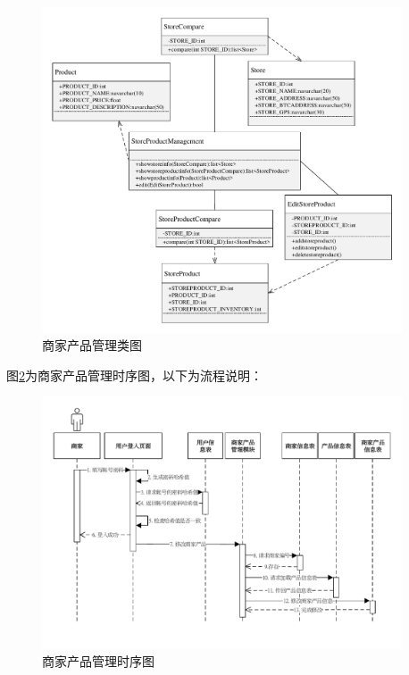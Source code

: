 	\begin{figure}[!htbp]
		\centering
		\includegraphics[width = 0.95\textwidth]{c2.pdf}
		\caption{商家产品管理类图}\label{c2}
	\end{figure}

	图\ref{time3}为商家产品管理时序图，以下为流程说明：

	\begin{figure}[!htbp]
		\centering
		\includegraphics[width = 0.95\textwidth]{time3.pdf}
		\caption{商家产品管理时序图}\label{time3}
	\end{figure}


